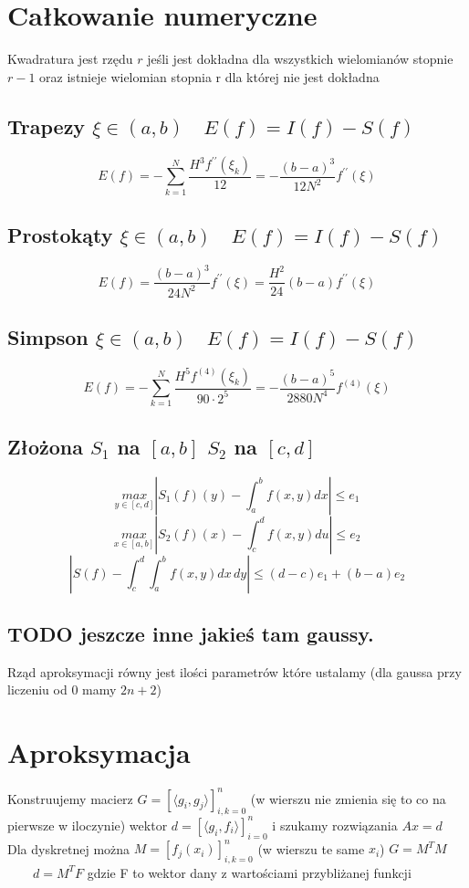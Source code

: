 \documentclass[twocolumn]{article}
\begin{document}
\begin{flushleft}
\thispagestyle{empty} %

\section{Całkowanie numeryczne}
Kwadratura jest rzędu $r$ jeśli jest dokładna dla wszystkich wielomianów stopnie $r-1$ oraz istnieje wielomian stopnia r dla której nie jest dokładna\\
\subsection{Trapezy $\xi \in \left(a,b\right) \quad E(f) = I(f) - S(f)$}
$$E(f) = -\sum_{k=1}^{N}\frac{H^3f^{\prime\prime}(\xi_k)}{12} =- \frac{(b-a)^3}{12N^2}f^{\prime\prime}(\xi)$$
\subsection{Prostokąty $\xi \in \left(a,b\right) \quad E(f) = I(f) - S(f)$}
$$E(f) = \frac{(b-a)^3}{24N^2}f^{\prime\prime}(\xi) = \frac{H^2}{24}(b-a) f^{\prime\prime}(\xi)$$
\subsection{Simpson $\xi \in \left(a,b\right) \quad E(f) = I(f) - S(f)$}
$$E(f)= -\sum_{k=1}^N \frac{H^5f^{(4)}(\xi_k)}{90\cdot2^5} =- \frac{(b-a)^5}{2880N^4}f^{(4)}(\xi) $$%
\subsection{Złożona $S_1$ na $[a,b]$ $S_2$ na $[c,d]$}
$$\underset{y\in[c,d]}{max} \left| S_1(f)(y) - \int_a^bf(x,y)dx \right| \leq e_1$$
$$\underset{x\in[a,b]}{max} \left| S_2(f)(x) - \int_c^df(x,y)du \right| \leq e_2$$
$$\left| S(f) - \int_c^d\int_a^b f(x,y) dx \,dy \right| \leq (d-c) e_1 + (b-a) e_2$$
\subsection{TODO jeszcze inne jakieś tam gaussy.}
Rząd aproksymacji równy jest ilości parametrów które ustalamy (dla gaussa przy liczeniu od 0 mamy $2n+2$)
\section{Aproksymacja}
Konstruujemy macierz $G = \left[\langle g_i,g_j \rangle\right]_{i,k = 0}^n$ (w wierszu nie zmienia się to co na pierwsze w iloczynie) wektor $d = \left[\langle g_i, f_i\rangle \right]_{i = 0}^n$ i szukamy rozwiązania $Ax=d$\\
Dla dyskretnej można $M = \left[f_j(x_i)\right]_{i,k = 0}^n$ (w wierszu te same $x_i$) $G = M^TM$ \ \ \ \  $d = M^TF$ gdzie F to wektor dany z wartościami przybliżanej funkcji

\end{flushleft}
\end{document}
